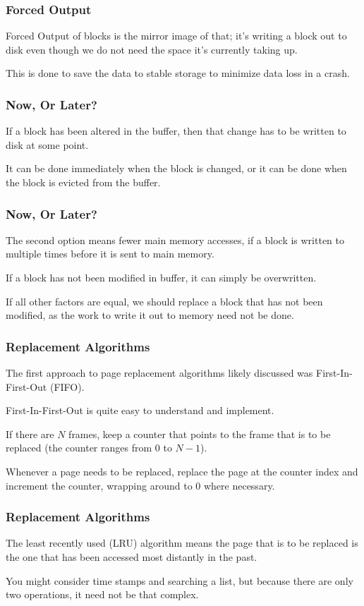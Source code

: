 \begin{frame}
\frametitle{Forced Output}

\alert{Forced Output} of blocks is the mirror image of that; it's writing a block out to disk even though we do not need the space it's currently taking up. 

This is done to save the data to stable storage to minimize data loss in a crash.

\end{frame}


\begin{frame}
\frametitle{Now, Or Later?}

If a block has been altered in the buffer, then that change has to be written to disk at some point. 

It can be done immediately when the block is changed, or it can be done when the block is evicted from the buffer. 


\end{frame}


\begin{frame}
\frametitle{Now, Or Later?}

The second option means fewer main memory accesses, if a block is written to multiple times before it is sent to main memory. 

If a block has not been modified in buffer, it can simply be overwritten. 

If all other factors are equal, we should replace a block that has not been modified, as the work to write it out to memory need not be done.


\end{frame}

\begin{frame}
\frametitle{Replacement Algorithms}

The first approach to page replacement algorithms likely discussed was First-In-First-Out (FIFO). 

First-In-First-Out is quite easy to understand and implement. 

If there are $N$ frames, keep a counter that points to the frame that is to be replaced (the counter ranges from $0$ to $N-1$). 

Whenever a page needs to be replaced, replace the page at the counter index and increment the counter, wrapping around to 0 where necessary.

\end{frame}

\begin{frame}
\frametitle{Replacement Algorithms}

The least recently used (LRU) algorithm means the page that is to be replaced is the one that has been accessed most distantly in the past. 

You might consider time stamps and searching a list, but because there are only two operations, it need not be that complex. 

\end{frame}

